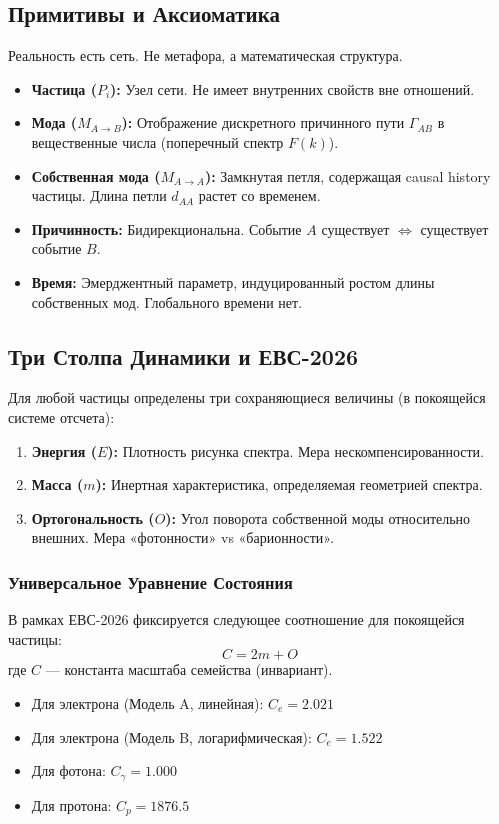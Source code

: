 \documentclass[12pt,a4paper]{article}
\begin{document}
\subsection{Примитивы и Аксиоматика}
Реальность есть сеть. Не метафора, а математическая структура.
\begin{itemize}
    \item \textbf{Частица ($P_i$):} Узел сети. Не имеет внутренних свойств вне отношений.
    \item \textbf{Мода ($M_{A \to B}$):} Отображение дискретного причинного пути $\Gamma_{AB}$ в вещественные числа (поперечный спектр $F(k)$).
    \item \textbf{Собственная мода ($M_{A \to A}$):} Замкнутая петля, содержащая causal history частицы. Длина петли $d_{AA}$ растет со временем.
    \item \textbf{Причинность:} Бидирекциональна. Событие $A$ существует $\iff$ существует событие $B$.
    \item \textbf{Время:} Эмерджентный параметр, индуцированный ростом длины собственных мод. Глобального времени нет.
\end{itemize}

\subsection{Три Столпа Динамики и ЕВС-2026}
Для любой частицы определены три сохраняющиеся величины (в покоящейся системе отсчета):
\begin{enumerate}
    \item \textbf{Энергия ($E$):} Плотность рисунка спектра. Мера нескомпенсированности.
    \item \textbf{Масса ($m$):} Инертная характеристика, определяемая геометрией спектра.
    \item \textbf{Ортогональность ($O$):} Угол поворота собственной моды относительно внешних. Мера «фотонности» vs «барионности».
\end{enumerate}

\subsubsection{Универсальное Уравнение Состояния}
В рамках ЕВС-2026 фиксируется следующее соотношение для покоящейся частицы:
\begin{equation}
    C = 2m + O
\end{equation}
где $C$ — константа масштаба семейства (инвариант).
\begin{itemize}
    \item Для электрона (Модель A, линейная): $C_e = 2.021$
    \item Для электрона (Модель B, логарифмическая): $C_e = 1.522$
    \item Для фотона: $C_\gamma = 1.000$
    \item Для протона: $C_p = 1876.5$
\end{itemize}
\end{document}
